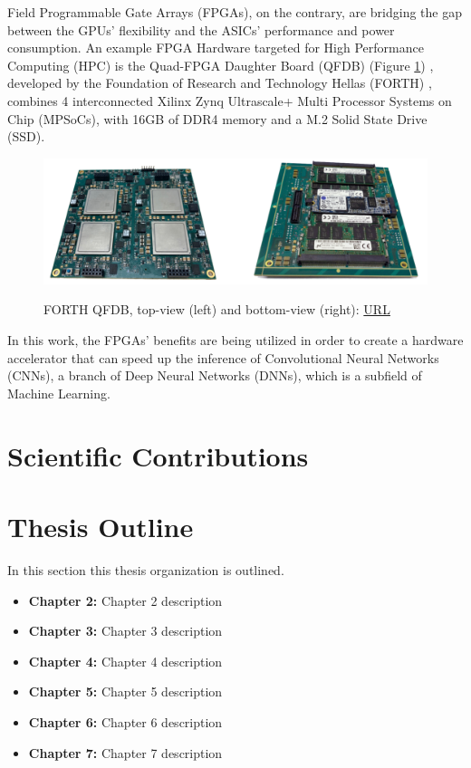 Field Programmable Gate Arrays (FPGAs), on the contrary, are bridging the gap between the GPUs' flexibility and the ASICs' performance and power consumption. An example FPGA Hardware targeted for High Performance Computing (HPC) is the Quad-FPGA Daughter Board (QFDB) (Figure \ref{fig:forth-qfdb-daughterboard}) \cite{Implementation-and-Impact-of-an-Ultra-Compact-Multi-FPGA-Board-for-Large-System-Prototyping}, developed by the Foundation of Research and Technology Hellas (FORTH) \cite{FORTH}, combines 4 interconnected Xilinx Zynq Ultrascale+ Multi Processor Systems on Chip (MPSoCs), with 16GB of DDR4 memory and a M.2 Solid State Drive (SSD).

\begin{figure} [h]
	\centering
	\includegraphics[width=\textwidth]{Images/Hardware/QFDB.png}\\[0.5cm]
	\decoRule
	\caption[FORTH QFDB]{FORTH QFDB, top-view (left) and bottom-view (right): \href{https://ieeexplore.ieee.org/stamp/stamp.jsp?arnumber=8945720}{URL}}
	\label{fig:forth-qfdb-daughterboard}
\end{figure}

In this work, the FPGAs' benefits are being utilized in order to create a hardware accelerator that can speed up the inference of Convolutional Neural Networks (CNNs), a branch of Deep Neural Networks (DNNs), which is a subfield of Machine Learning.

\section{Scientific Contributions}

\section{Thesis Outline}

In this section this thesis organization is outlined.

\begin{itemize}
	\item \textbf{Chapter 2:} Chapter 2 description
	\item \textbf{Chapter 3:} Chapter 3 description
	\item \textbf{Chapter 4:} Chapter 4 description
	\item \textbf{Chapter 5:} Chapter 5 description
	\item \textbf{Chapter 6:} Chapter 6 description
	\item \textbf{Chapter 7:} Chapter 7 description
\end{itemize}
